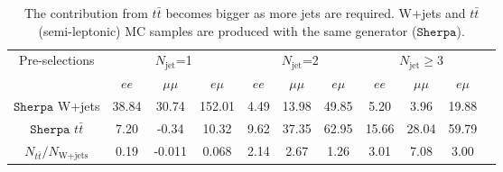 \begin{table}[h]
\begin{center}
\begin{tabular}{c|ccc|ccc|cccc}
\hline
\hline
Pre-selections     &\multicolumn{3}{c|}{$N_{\text{jet}}$=1}   &\multicolumn{3}{c|}{$N_{\text{jet}}$=2}   &\multicolumn{3}{c}{$N_{\text{jet}}\geq$3}  \\
                            &$ee$    &$\mu\mu$   &$e\mu$   &$ee$    &$\mu\mu$   &$e\mu$  &$ee$    &$\mu\mu$   &$e\mu$\\
$\texttt{Sherpa}$ W+jets     &38.84  &30.74    &152.01   &4.49    &13.98    &49.85   &5.20    &3.96     &19.88 \\   
$\texttt{Sherpa}$ $t\bar{t}$ &7.20   &-0.34     & 10.32   &9.62    &37.35    &62.95   &15.66   &28.04    &59.79 \\
\hline
$N_{t\bar{t}}/N_{\text{W+jets}}$  &0.19 &-0.011 &0.068   &2.14  &2.67   &1.26    &3.01  &7.08    &3.00 \\
\hline
\hline
\end{tabular}
\caption{The contribution from $t\bar{t}$ becomes bigger as more jets are required. W+jets and $t\bar{t}$ (semi-leptonic) MC samples are produced with the same generator ($\texttt{Sherpa}$).}
\label{tab:fractions_ttbarOverWjets}
\end{center}
\end{table}
